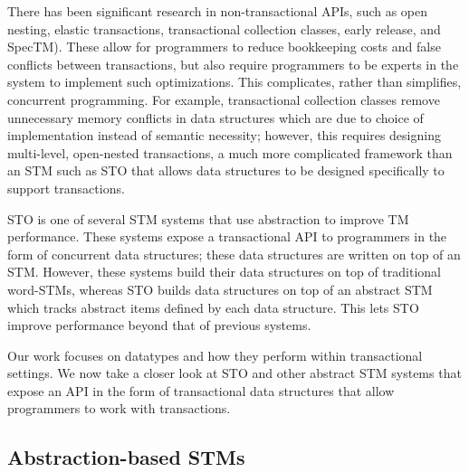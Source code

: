 There has been significant research in non-transactional APIs, such as open nesting\cite{opennesting}, elastic transactions\cite{elastic}, transactional collection classes\cite{tcc}, early release\cite{earlyrelease}, and SpecTM\cite{spectm}). These allow for programmers to reduce bookkeeping costs and false conflicts between transactions, but also require programmers to be experts in the system to implement such optimizations. This complicates, rather than simplifies, concurrent programming. For example, transactional collection classes remove unnecessary memory conflicts in data structures which are due to choice of implementation instead of semantic necessity; however, this requires designing multi-level, open-nested transactions, a much more complicated framework than an STM such as STO that allows data structures to be designed specifically to support transactions.

STO is one of several STM systems that use abstraction to improve TM performance\cite{boost}\cite{optboost}\cite{autolock}\cite{predication}. These systems expose a transactional API to programmers in the form of concurrent data structures; these data structures are written on top of an STM. However, these systems build their data structures on top of traditional word-STMs, whereas STO builds data structures on top of an abstract STM which tracks abstract items defined by each data structure. This lets STO improve performance beyond that of previous systems. 

Our work focuses on datatypes and how they perform within transactional settings. We now take a closer look at STO and other abstract STM systems that expose an API in the form of transactional data structures that allow programmers to work with transactions.

\subsection{Abstraction-based STMs}

